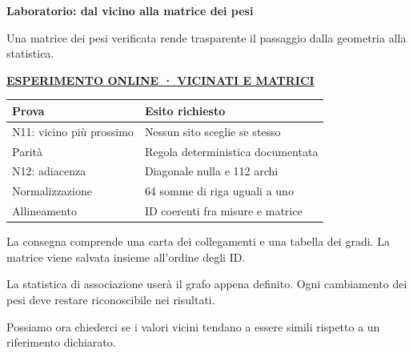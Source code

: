 \documentclass[12pt,aspectratio=1610]{beamer}
\newcommand{\PBody}[1]{\par{\fontsize{11.3}{14.8}\selectfont #1\par}}
\newcommand{\PSmall}[1]{\par{\fontsize{9.8}{13.1}\selectfont #1\par}}
\newcommand{\PInfo}[1]{%
\begin{tcolorbox}[enhanced,arc=1.6mm,boxrule=.55pt,colback=GeoTint,
 colframe=Rule!80!Classical,left=2.3mm,right=2.3mm,top=2mm,bottom=2mm,
 before skip=1mm,after skip=1mm]
\PSmall{#1}\end{tcolorbox}}
\newcommand{\PLab}[2]{\par{\color{Classical}\bfseries\fontsize{9}{11}\selectfont
\href{#1}{\MakeUppercase{#2}}}\par\vspace{1.8mm}}
\begin{document}
\begin{frame}[plain]\hypertarget{slide55}{}
\begin{lrbox}{\TitleBox}
\begin{minipage}[t]{17.7cm}\raggedright\color{Ink}\fontsize{11.3}{14.8}\selectfont
\color{Navy}\bfseries\fontsize{20.6}{24.5}\selectfont Laboratorio: dal vicino alla matrice dei pesi
\end{minipage}\end{lrbox}

\begin{lrbox}{\RecallBox}
\begin{minipage}[t]{14.3cm}\raggedright\color{Ink}\fontsize{11.3}{14.8}\selectfont
\fontsize{10.3}{13.8}\selectfont Una matrice dei pesi verificata rende trasparente il passaggio dalla geometria alla statistica.
\end{minipage}\end{lrbox}

\begin{lrbox}{\PilotLeftBox}
\begin{minipage}[t]{10.05cm}\raggedright\color{Ink}\fontsize{11.3}{14.8}\selectfont
\PLab{https://marzione00.github.io/Lab_Geo/\#laboratorio/m11-vicinati}{Esperimento online · vicinati e matrici}
{\fontsize{10.2}{13.1}\selectfont\renewcommand{\arraystretch}{1.45}\begin{tabular}{@{}p{4.0cm}p{5.0cm}@{}}\toprule
\textbf{Prova} & \textbf{Esito richiesto}\\\midrule
N11: vicino più prossimo & Nessun sito sceglie se stesso\\
Parità & Regola deterministica documentata\\
N12: adiacenza & Diagonale nulla e 112 archi\\
Normalizzazione & 64 somme di riga uguali a uno\\
Allineamento & ID coerenti fra misure e matrice\\
\bottomrule\end{tabular}}

\end{minipage}\end{lrbox}

\begin{lrbox}{\PilotRightBox}
\begin{minipage}[t]{7.55cm}\raggedright\color{Ink}\fontsize{11.3}{14.8}\selectfont
\PBody{La consegna comprende una carta dei collegamenti e una tabella dei gradi. La matrice viene salvata insieme all’ordine degli ID.}
\vspace{2.5mm}
\PInfo{La statistica di associazione userà il grafo appena definito. Ogni cambiamento dei pesi deve restare riconoscibile nei risultati.}
\PBody{Possiamo ora chiederci se i valori vicini tendano a essere simili rispetto a un riferimento dichiarato.}
\vspace{2.5mm}


\end{minipage}
\end{lrbox}
\end{frame}
\end{document}
